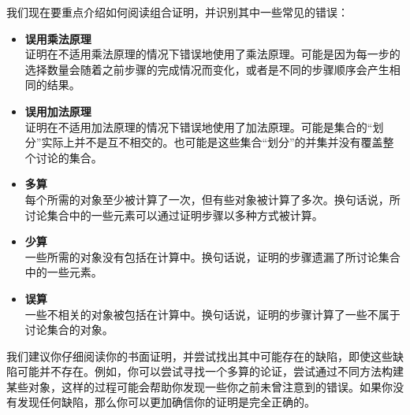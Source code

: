 我们现在要重点介绍如何阅读组合证明，并识别其中一些常见的错误：
\begin{itemize}
    \item \textbf{误用乘法原理}\\
          证明在不适用乘法原理的情况下错误地使用了乘法原理。可能是因为每一步的选择数量会随着之前步骤的完成情况而变化，或者是不同的步骤顺序会产生相同的结果。
    \item \textbf{误用加法原理}\\
          证明在不适用加法原理的情况下错误地使用了加法原理。可能是集合的``划分''实际上并不是互不相交的。也可能是这些集合``划分''的并集并没有覆盖整个讨论的集合。
    \item \textbf{多算}\\
          每个所需的对象至少被计算了一次，但有些对象被计算了多次。换句话说，所讨论集合中的一些元素可以通过证明步骤以多种方式被计算。
    \item \textbf{少算}\\
          一些所需的对象没有包括在计算中。换句话说，证明的步骤遗漏了所讨论集合中的一些元素。
    \item \textbf{误算}\\
          一些不相关的对象被包括在计算中。换句话说，证明的步骤计算了一些不属于讨论集合的对象。
\end{itemize}
我们建议你仔细阅读你的书面证明，并尝试找出其中可能存在的缺陷，即使这些缺陷可能并不存在。例如，你可以尝试寻找一个多算的论证，尝试通过不同方法构建某些对象，这样的过程可能会帮助你发现一些你之前未曾注意到的错误。如果你没有发现任何缺陷，那么你可以更加确信你的证明是完全正确的。

